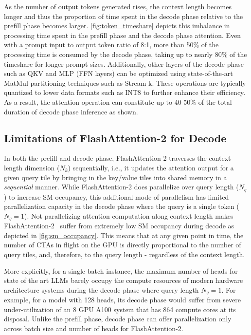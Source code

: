 As the number of output tokens generated rises, the context length becomes longer and thus the proportion of time spent in the decode phase relative to the prefill phase becomes larger. \autoref{fig:token_timeshare} depicts this imbalance in processing time spent in the prefill phase and the decode phase attention. Even with a prompt input to output token ratio of 8:1, more than 50\% of the processing time is consumed by the decode phase, taking up to nearly 80\% of the timeshare for longer prompt sizes. Additionally, other layers of the decode phase such as QKV and MLP (FFN layers) can be optimized using state-of-the-art MatMul partitioning techniques such as Stream-k. These operations are typically quantized to lower data formats such as INT8 to further enhance their efficiency. As a result, the attention operation can constitute up to 40-50\% of the total duration of decode phase inference as shown.

\subsection{Limitations of FlashAttention-2 for Decode}
\label{subsec:limitations}

In both the prefill and decode phase, FlashAttention-2 traverses the context length dimension ($N_k$) sequentially, i.e., it updates the attention output for a given query tile by bringing in the key/value tiles into shared memory in a \emph{sequential} manner. While FlashAttention-2 does parallelize over query length ($N_q$) to increase SM occupancy, this additional mode of parallelism has limited parallelization capacity in the decode phase where the query is a single token ($N_q = 1$). Not parallelizing attention computation along context length makes FlashAttention-2~\cite{dao2023flashattention2} suffer from extremely low SM occupancy during decode as depicted in \autoref{fig:sm_occupancy}. This means that at any given point in time, the number of CTAs in flight on the GPU is directly proportional to the number of query tiles, and, therefore, to the query length - regardless of the context length.

More explicitly, for a single batch instance, the maximum number of heads for state of the art LLMs barely occupy the compute resources of modern hardware architecture systems during the decode phase where query length $N_q = 1$. For example, for a model with 128 heads, its decode phase would suffer from severe under-utilization of an 8 GPU A100 system that has 864 compute cores at its disposal. Unlike the prefill phase, decode phase can offer parallelization only across batch size and number of heads for FlashAttention-2.

